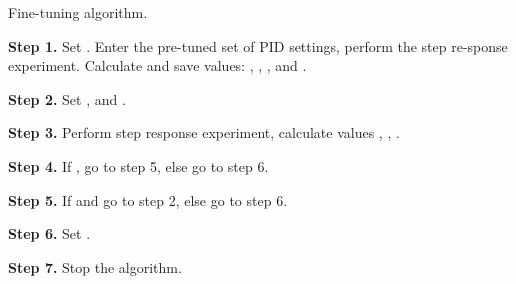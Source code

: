 \documentclass{amcs}
\begin{document}
\begin{algorithm}[!h]
	\caption{Fine-tuning algorithm.}
	\label{a:alg1}
	\textbf{Step 1.} Set  . Enter the pre-tuned set of PID settings, perform the step re-sponse experiment. Calculate and save values:  ,  ,  , and  .
	
	\smallskip
	\textbf{Step 2.} Set   ,  and   .
	
	\smallskip
	\textbf{Step 3.} Perform step response experiment, calculate values   ,  ,  .
	
	\smallskip
	\textbf{Step 4.} If  , go to step 5, else go to step 6.
	
	\smallskip
	\textbf{Step 5.} If   and   go to step 2, else go to step 6.
	
	\smallskip
	\textbf{Step 6.} Set  .
	
	\smallskip
	\textbf{Step 7.} Stop the algorithm.
	
\end{algorithm}
\end{document}
